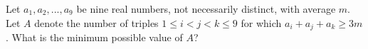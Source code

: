 Let $a_1,a_2,...,a_9$ be nine real numbers, not necessarily distinct, with average $m$. Let $A$ denote the number of triples $1 \le i < j < k \le 9$ for which $a_i + a_j + a_k \ge 3m$.  What is the minimum possible value of $A$?

